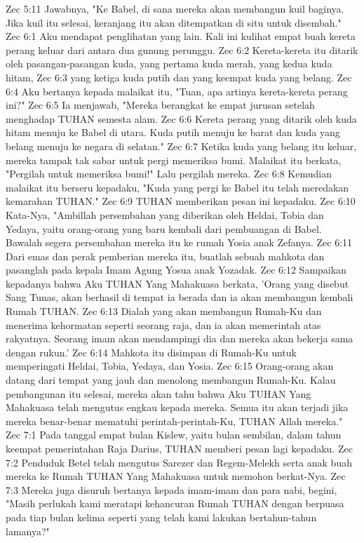 Zec 5:11  Jawabnya, "Ke Babel, di sana mereka akan membangun kuil baginya. Jika kuil itu selesai, keranjang itu akan ditempatkan di situ untuk disembah."
Zec 6:1  Aku mendapat penglihatan yang lain. Kali ini kulihat empat buah kereta perang keluar dari antara dua gunung perunggu.
Zec 6:2  Kereta-kereta itu ditarik oleh pasangan-pasangan kuda, yang pertama kuda merah, yang kedua kuda hitam,
Zec 6:3  yang ketiga kuda putih dan yang keempat kuda yang belang.
Zec 6:4  Aku bertanya kepada malaikat itu, "Tuan, apa artinya kereta-kereta perang ini?"
Zec 6:5  Ia menjawab, "Mereka berangkat ke empat jurusan setelah menghadap TUHAN semesta alam.
Zec 6:6  Kereta perang yang ditarik oleh kuda hitam menuju ke Babel di utara. Kuda putih menuju ke barat dan kuda yang belang menuju ke negara di selatan."
Zec 6:7  Ketika kuda yang belang itu keluar, mereka tampak tak sabar untuk pergi memeriksa bumi. Malaikat itu berkata, "Pergilah untuk memeriksa bumi!" Lalu pergilah mereka.
Zec 6:8  Kemudian malaikat itu berseru kepadaku, "Kuda yang pergi ke Babel itu telah meredakan kemarahan TUHAN."
Zec 6:9  TUHAN memberikan pesan ini kepadaku.
Zec 6:10  Kata-Nya, "Ambillah persembahan yang diberikan oleh Heldai, Tobia dan Yedaya, yaitu orang-orang yang baru kembali dari pembuangan di Babel. Bawalah segera persembahan mereka itu ke rumah Yosia anak Zefanya.
Zec 6:11  Dari emas dan perak pemberian mereka itu, buatlah sebuah mahkota dan pasanglah pada kepala Imam Agung Yosua anak Yozadak.
Zec 6:12  Sampaikan kepadanya bahwa Aku TUHAN Yang Mahakuasa berkata, 'Orang yang disebut Sang Tunas, akan berhasil di tempat ia berada dan ia akan membangun kembali Rumah TUHAN.
Zec 6:13  Dialah yang akan membangun Rumah-Ku dan menerima kehormatan seperti seorang raja, dan ia akan memerintah atas rakyatnya. Seorang imam akan mendampingi dia dan mereka akan bekerja sama dengan rukun.'
Zec 6:14  Mahkota itu disimpan di Rumah-Ku untuk memperingati Heldai, Tobia, Yedaya, dan Yosia.
Zec 6:15  Orang-orang akan datang dari tempat yang jauh dan menolong membangun Rumah-Ku. Kalau pembangunan itu selesai, mereka akan tahu bahwa Aku TUHAN Yang Mahakuasa telah mengutus engkau kepada mereka. Semua itu akan terjadi jika mereka benar-benar mematuhi perintah-perintah-Ku, TUHAN Allah mereka."
Zec 7:1  Pada tanggal empat bulan Kislew, yaitu bulan sembilan, dalam tahun keempat pemerintahan Raja Darius, TUHAN memberi pesan lagi kepadaku.
Zec 7:2  Penduduk Betel telah mengutus Sarezer dan Regem-Melekh serta anak buah mereka ke Rumah TUHAN Yang Mahakuasa untuk memohon berkat-Nya.
Zec 7:3  Mereka juga disuruh bertanya kepada imam-imam dan para nabi, begini, "Masih perlukah kami meratapi kehancuran Rumah TUHAN dengan berpuasa pada tiap bulan kelima seperti yang telah kami lakukan bertahun-tahun lamanya?"
